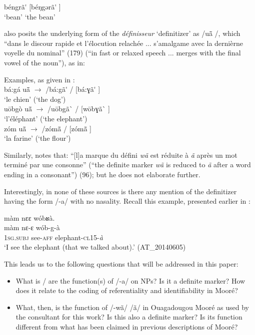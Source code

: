 \documentclass[output=paper]{langsci/langscibook}
\begin{document}
  béngrã\'{}  [béŋgərã\'{} ] \\
‘bean’  {‘the bean’} \\
\z

\cite{canu1974} also posits the underlying form of the \textit{définisseur} ‘definitizer’ as /uã\={} /, which “dans le discour rapide et l’élocution relachée ... s’amalgame avec la dernièrne voyelle du nominal” (179) (“in fast or relaxed speech ... merges with the final vowel of the noun”), as in:

\ea\label{ex:teo:12}
Examples, as given in \citet[179]{canu1974}:\\
bá:gá uã\={}  \textup{${\rightarrow}$}\textup{ /bá:gã\'{} / [bá:ɣã\'{} ]} \\
‘le chien’ (‘the dog’)\\

u\={o}bgò uã\={}  \textup{${\rightarrow}$}\textup{ /u\={o}bgã\`{} / [w\={o}bɣã\`{} ]} \\
‘l’éléphant’ (‘the elephant’)\\

zóm uã\={}  \textup{${\rightarrow}$}\textup{ /zómã\={} / [zómã\={} ]} \\
‘la farine’ (‘the flour’)
\z

Similarly, \cite{Nikiema1989} notes that: “[l]a marque du défini \textit{wã} est réduite à \textit{ã} après un mot terminé par une consonne” (“the definite marker \textit{wã} is reduced to \textit{ã} after a word ending in a consonant”) (96); but he does not elaborate further.

Interestingly, in none of these sources is there any mention of the definitizer having the form /-a/ with no nasality. Recall this example, presented earlier in :

\ea\label{ex:teo:4repeated}
 màm nɛɛ wóbʁà.\\
\gll màm nɛ-ɛ wób-g-à\\
\textsc{1sg.subj} see-\textsc{aff} elephant-\textsc{cl15-}\textit{à} \\
\glt ‘I see the elephant (that we talked about).’ (AT\_20140605)
\z

This leads us to the following questions that will be addressed in this paper:
 
\begin{itemize}
	\item What is / are the function(s) of /-a/ on NPs? Is it a definite marker? How does it relate to the coding of referentiality and identifiability in Mooré?
\item What, then, is the function of /-wã/ {\Tilde} /ã/ in Ouagadougou Mooré as used by the consultant for this work? Is this also a definite marker? Is its function different from what has been claimed in previous descriptions of Mooré?
\end{itemize}
\end{document}
